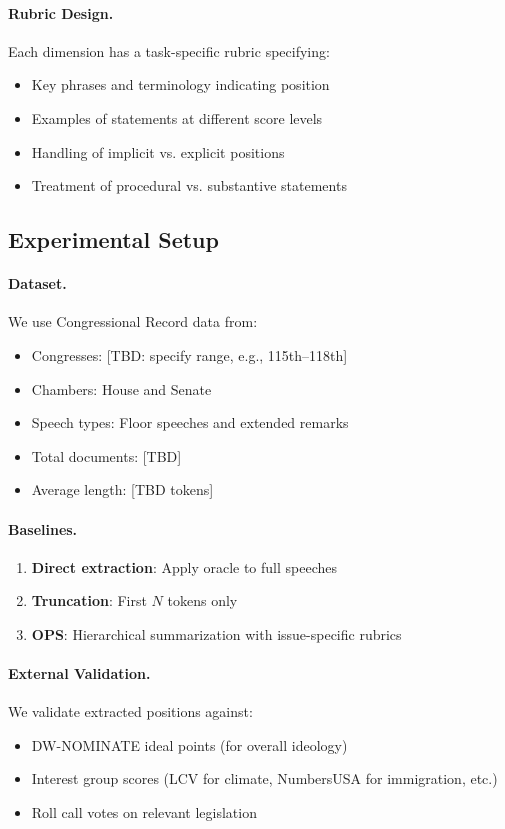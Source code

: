\paragraph{Rubric Design.}
Each dimension has a task-specific rubric specifying:
\begin{itemize}[nosep]
    \item Key phrases and terminology indicating position
    \item Examples of statements at different score levels
    \item Handling of implicit vs. explicit positions
    \item Treatment of procedural vs. substantive statements
\end{itemize}

\subsection{Experimental Setup}

\paragraph{Dataset.}
We use Congressional Record data from:
\begin{itemize}[nosep]
    \item Congresses: [TBD: specify range, e.g., 115th--118th]
    \item Chambers: House and Senate
    \item Speech types: Floor speeches and extended remarks
    \item Total documents: [TBD]
    \item Average length: [TBD tokens]
\end{itemize}

\paragraph{Baselines.}
\begin{enumerate}[nosep]
    \item \textbf{Direct extraction}: Apply oracle to full speeches
    \item \textbf{Truncation}: First $N$ tokens only
    \item \textbf{OPS}: Hierarchical summarization with issue-specific rubrics
\end{enumerate}

\paragraph{External Validation.}
We validate extracted positions against:
\begin{itemize}[nosep]
    \item DW-NOMINATE ideal points (for overall ideology)
    \item Interest group scores (LCV for climate, NumbersUSA for immigration, etc.)
    \item Roll call votes on relevant legislation
\end{itemize}

